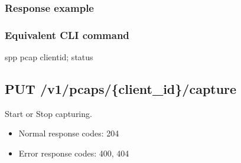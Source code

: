 \documentclass[a4paper,11pt,openany,oneside,english]{sphinxmanual}
\begin{document}
\subsubsection{Response example}
\label{\detokenize{api_ref/spp_pcap:response-example}}
\begin{sphinxVerbatim}[commandchars=\\\{\},formatcom=\footnotesize]
   
   
   \PYG{p}{[}
       
       
       \PYG{p}{[}
         
      \PYG{p}{]}
       
       
       
  \PYG{p}{]}
\end{sphinxVerbatim}


\subsubsection{Equivalent CLI command}
\label{\detokenize{api_ref/spp_pcap:equivalent-cli-command}}
\begin{sphinxVerbatim}[commandchars=\\\{\},formatcom=\footnotesize]
spp \PYGZgt{} pcap \PYGZob{}client\PYGZus{}id\PYGZcb{}; status
\end{sphinxVerbatim}


\subsection{PUT /v1/pcaps/\{client\_id\}/capture}
\label{\detokenize{api_ref/spp_pcap:put-v1-pcaps-client-id-capture}}
Start or Stop capturing.
\begin{itemize}
\item {} 
Normal response codes: 204

\item {} 
Error response codes: 400, 404

\end{itemize}
\end{document}
